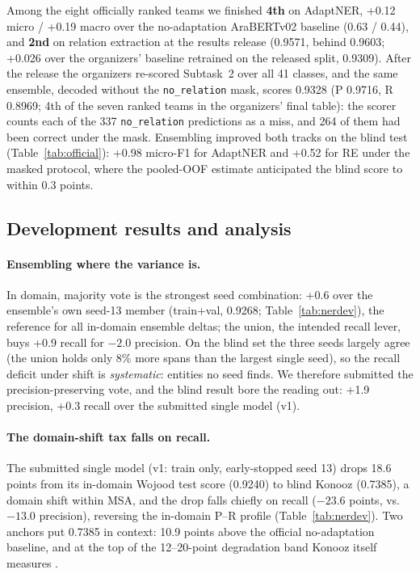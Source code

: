 \documentclass[11pt]{article}
\begin{document}
Among the eight officially ranked teams we finished \textbf{4th} on
AdaptNER, +0.12 micro / +0.19 macro over the no-adaptation AraBERTv02
baseline (0.63 / 0.44), and \textbf{2nd} on relation extraction at the
results release (0.9571, behind 0.9603; +0.026 over the organizers'
baseline retrained on the released split, 0.9309). After the release the
organizers re-scored Subtask~2 over all 41 classes, and the same
ensemble, decoded without the \texttt{no\_relation} mask, scores 0.9328
(P 0.9716, R 0.8969; 4th of the seven ranked teams in the organizers'
final table): the
scorer counts each of the 337 \texttt{no\_relation} predictions as a
miss, and 264 of them had been correct under the mask. Ensembling
improved both tracks on the blind
test (Table~\ref{tab:official}): +0.98 micro-F1 for AdaptNER and +0.52
for RE under the masked protocol, where the pooled-OOF estimate
anticipated the blind score to within 0.3 points.

\subsection{Development results and analysis}
\label{sec:dev}

\paragraph{Ensembling where the variance is.} In domain, majority vote
is the strongest seed combination: +0.6 over the ensemble's own seed-13
member (train+val, 0.9268; Table~\ref{tab:nerdev}), the reference for
all in-domain ensemble deltas; the union, the intended recall lever, buys
+0.9 recall for $-2.0$ precision. On the blind set the three seeds largely
agree (the union holds only 8\% more spans than the largest single
seed), so the recall deficit under shift is \emph{systematic}: entities
no seed finds. We therefore submitted the precision-preserving vote, and
the blind result bore the reading out: +1.9 precision, +0.3 recall over
the submitted single model (v1).

\paragraph{The domain-shift tax falls on recall.} The submitted single
model (v1: train only, early-stopped seed 13) drops 18.6 points from its
in-domain Wojood test score (0.9240) to blind Konooz (0.7385), a domain
shift within MSA,
and the drop falls chiefly on recall ($-23.6$ points, vs.\ $-13.0$
precision), reversing the in-domain P--R profile
(Table~\ref{tab:nerdev}). Two anchors put 0.7385 in context:
10.9 points above the official no-adaptation baseline, and at the top of
the 12--20-point
degradation band Konooz itself measures \citep{hamad-etal-2025-konooz}.
\end{document}
